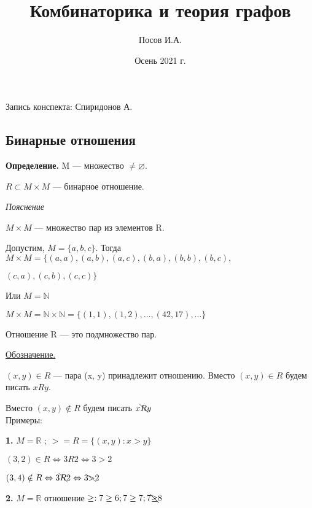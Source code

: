 \documentclass[a4paper, 12pt] {article}
\title{Комбинаторика и теория графов}
\author{Посов И.А.}
\date{Осень 2021 г.}
\begin{document}
	
	
	\maketitle
	\begin{center}
		Запись конспекта: Спиридонов А.
	\end{center}

	\thispagestyle{empty}
	\newpage
	
	\begin{center}
		\tableofcontents
	\end{center}
	
	\newpage
	
	\begin{center}
		\section{Бинарные отношения}
	\end{center}
	\textbf{Определение.} M --- множество $\ne \varnothing$.
	
	$R\subset M \times M$ --- бинарное отношение.
	
	\textit{Пояснение}
	
	$M \times M$ --- множество пар из элементов R.
	
	Допустим, $M = \{ a, b, c \}$. Тогда $M \times M = \{ (a, a), (a, b), (a, c), (b, a), (b, b), (b, c), $
	
	$(c, a), (c, b), (c, c)\}$
	
	Или $M = \mathbb N$
	
	$M \times M = \mathbb N \times \mathbb N =  \{ (1, 1), (1, 2), \dots, (42, 17), \dots\}$
	
	Отношение R --- это подмножество пар.
	
	\underline{Обозначение.}
	
	$(x, y) \in R$ --- пара (x, y) принадлежит отношению. Вместо $(x, y) \in R$ будем писать $xRy$.
	
	Вместо $(x, y) \notin R$ будем писать $x \bcancel Ry$\\
	
	
	Примеры: 
	
	\textbf{1.} $M = \mathbb R$ ; $> =R = \{ (x, y): x > y \}$
	
	$(3,2) \in R \Leftrightarrow 3R2 \Leftrightarrow 3>2$
	
	$(3,4) \notin R \Leftrightarrow 3 \bcancel R2 \Leftrightarrow 3 \bcancel >2$
	
	\textbf{2.} $M = \mathbb R$ отношение $\ge: 7\ge6; 7\ge7; 7 \bcancel \ge 8$
	
\end{document}
